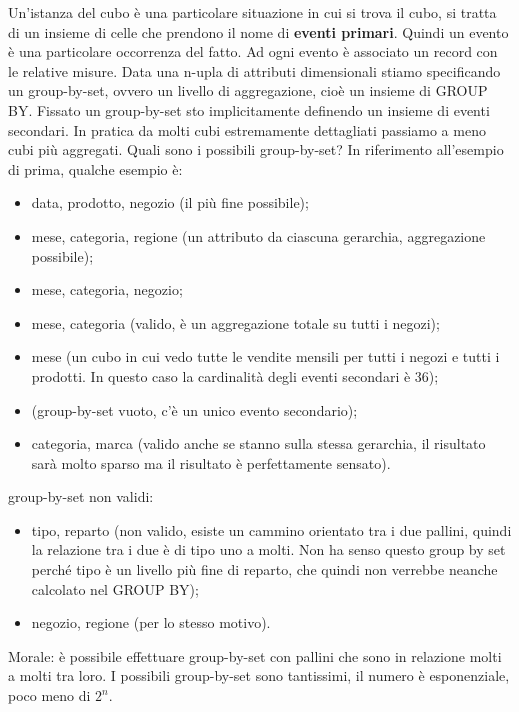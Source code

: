 Un'istanza del cubo è una particolare situazione in cui si trova il cubo, si tratta di un insieme di celle che prendono il nome di \textbf{eventi primari}. Quindi un evento è una particolare occorrenza del fatto. Ad ogni evento è associato un record con le relative misure.\newline
Data una n-upla di attributi dimensionali stiamo specificando un group-by-set, ovvero un livello di aggregazione, cioè un insieme di GROUP BY. Fissato un group-by-set sto implicitamente definendo un insieme di eventi secondari. In pratica da molti cubi estremamente dettagliati passiamo a meno cubi più aggregati.\newline
Quali sono i possibili group-by-set? In riferimento all'esempio di prima, qualche esempio è:
\begin{itemize}
	\item {data, prodotto, negozio} (il più fine possibile);
	\item {mese, categoria, regione} (un attributo da ciascuna gerarchia, aggregazione possibile);
	\item {mese, categoria, negozio};
	\item {mese, categoria} (valido, è un aggregazione totale su tutti i negozi);
	\item {mese} (un cubo in cui vedo tutte le vendite mensili per tutti i negozi e tutti i prodotti. In questo caso la cardinalità degli eventi secondari è 36);
	\item {} (group-by-set vuoto, c'è un unico evento secondario);
	\item {categoria, marca} (valido anche se stanno sulla stessa gerarchia, il risultato sarà molto sparso ma il risultato è perfettamente sensato).
\end{itemize}
group-by-set non validi:
\begin{itemize}
	\item {tipo, reparto} (non valido, esiste un cammino orientato tra i due pallini, quindi la relazione tra i due è di tipo uno a molti. Non ha senso questo group by set perché tipo è un livello più fine di reparto, che quindi non verrebbe neanche calcolato nel GROUP BY);
	\item {negozio, regione} (per lo stesso motivo).
\end{itemize}
Morale: è possibile effettuare group-by-set con pallini che sono in relazione molti a molti tra loro.\newline
I possibili group-by-set sono tantissimi, il numero è esponenziale, poco meno di $2^n$.\newline

